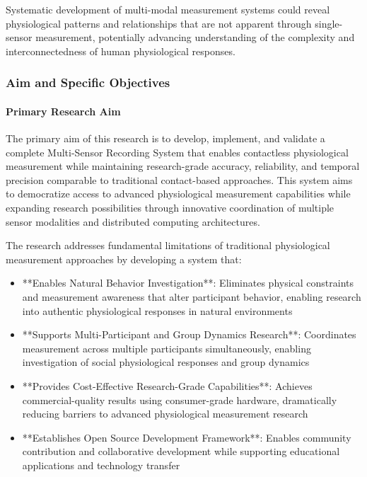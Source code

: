 \documentclass[11pt,a4paper]{article}
\begin{document}
Systematic development of multi-modal measurement systems could reveal
physiological patterns and relationships that are
not apparent through single-sensor measurement, potentially advancing
understanding of the complexity and
interconnectedness of human physiological responses.

\subsubsection{Aim and Specific Objectives}

\paragraph{Primary Research Aim}

The primary aim of this research is to develop, implement, and validate a
complete Multi-Sensor Recording System
that enables contactless physiological measurement while maintaining
research-grade accuracy, reliability, and temporal
precision comparable to traditional contact-based approaches. This system aims
to democratize access to advanced
physiological measurement capabilities while expanding research possibilities
through innovative coordination of
multiple sensor modalities and distributed computing architectures.

The research addresses fundamental limitations of traditional physiological
measurement approaches by developing a
system that:

\begin{itemize}
\item **Enables Natural Behavior Investigation**: Eliminates physical
constraints and measurement awareness that alter
participant behavior, enabling research into authentic physiological responses
in natural environments
\item **Supports Multi-Participant and Group Dynamics Research**: Coordinates
measurement across multiple participants
simultaneously, enabling investigation of social physiological responses and
group dynamics
\item **Provides Cost-Effective Research-Grade Capabilities**: Achieves
commercial-quality results using consumer-grade
hardware, dramatically reducing barriers to advanced physiological measurement
research
\item **Establishes Open Source Development Framework**: Enables community
contribution and collaborative development while
  supporting educational applications and technology transfer

\end{itemize}
\end{document}
